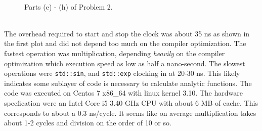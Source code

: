 \documentclass[singlepage,notitlepage,nofootinbib,11pt]{revtex4-1}
\begin{document}
\begin{figure}[h]
\ContinuedFloat
\centering
  \\
\caption{Parts (e) - (h) of Problem 2.}
\end{figure}\\
\indent The overhead required to start and stop the clock was about 35 ns as shown in the first plot and did not depend too much on the compiler optimization. The fastest operation was multiplication, depending {\it heavily} on the compiler optimization which execution speed as low as half a nano-second. The slowest operations were \verb|std::sin|, and \verb|std::exp| clocking in at 20-30 ns. This likely indicates some sublayer of code is necessary to calculate analytic functions. The code was executed on Centos 7 x86\_64 with linux kernel 3.10. The hardware specfication were an Intel Core i5  3.40 GHz CPU with about 6 MB of cache. This corresponds to about a 0.3 ns/cycle. It seems like on average multiplication takes about 1-2 cycles and division on the order of 10 or so.
\clearpage
\end{document}
